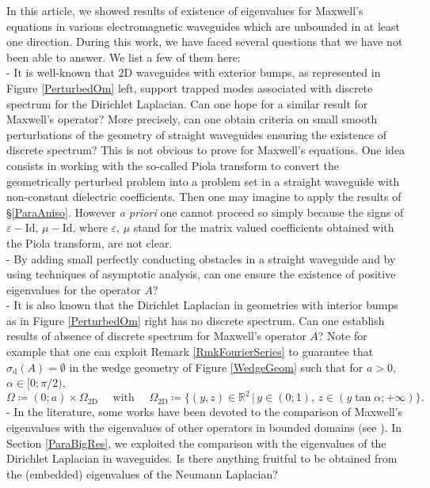 \documentclass[11pt,a4paper]{article}
\newcommand{\eps}{\varepsilon}
\newcommand{\Om}{\Omega}
\newcommand{\mrm}[1]{\mathrm{#1}}
\newcommand{\R}{\mathbb{R}}
\begin{document}
In this article, we showed results of existence of eigenvalues for Maxwell's equations in various electromagnetic waveguides which are unbounded in at least one direction. During this work, we have faced several questions that we have not been able to answer. We list a few of them here:\\[2pt]
- It is well-known that 2D waveguides with exterior bumps, as represented in Figure \ref{PerturbedOm} left, support trapped modes associated with discrete spectrum for the Dirichlet Laplacian. Can one hope for a similar result for Maxwell's operator? More precisely, can one obtain criteria on small smooth perturbations of the geometry of straight waveguides ensuring the existence of discrete spectrum? This is not obvious to prove for Maxwell's equations. One idea consists in working with the so-called Piola transform to convert the geometrically perturbed problem into a problem set in a straight waveguide with non-constant dielectric coefficients. Then one may imagine to apply the results of \S\ref{ParaAniso}. However \textit{a priori} one cannot proceed so simply because the signs of $\eps-\mrm{Id}$, $\mu-\mrm{Id}$, where  $\eps$, $\mu$ stand for the matrix valued coefficients obtained with the Piola transform, are not clear.\\[2pt]
- By adding small perfectly conducting obstacles in a straight waveguide and by using techniques of asymptotic analysis, can one ensure the existence of positive eigenvalues for the operator $A$?\\
- It is also known that the Dirichlet Laplacian in geometries with interior bumps as in Figure \ref{PerturbedOm} right has no discrete spectrum. Can one establish results of absence of discrete spectrum for Maxwell's operator $A$? Note for example that one can exploit Remark \ref{RmkFourierSeries} to guarantee that $\sigma_{\mrm{d}}(A)=\emptyset$ in the wedge geometry of Figure \ref{WedgeGeom} such that for $a>0$, $\alpha\in[0;\pi/2)$,  
\[
\Om\coloneqq (0;a)\times\Om_{\mrm{2D}}\quad\mbox{ with }\quad\Om_{\mrm{2D}}\coloneqq\{(y,z)\in\R^2\,|\,y\in(0;1),\,z\in(y\tan\alpha;+\infty)\}.
\]
- In the literature, some works have been devoted to the comparison of Maxwell's eigenvalues with the eigenvalues of other operators in bounded domains (see \cite{Paul15,Zhan18,Rohl24}). In Section \ref{ParaBigRes}, we exploited the comparison with the eigenvalues of the Dirichlet Laplacian in waveguides. Is there anything fruitful to be obtained from the (embedded) eigenvalues of the Neumann Laplacian?
\end{document}
